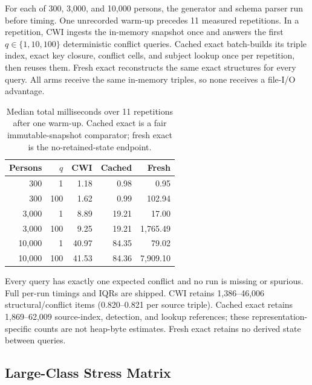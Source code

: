 \documentclass[letterpaper]{article}
\newcommand{\cwi}{\textsc{CWI}}
\begin{document}
For each of 300, 3,000, and 10,000 persons, the generator and schema parser run
before timing.  One unrecorded warm-up precedes 11 measured repetitions.  In a
repetition, \cwi{} ingests the in-memory snapshot once and answers the first
$q\in\{1,10,100\}$ deterministic conflict queries.  Cached exact batch-builds
its triple index, exact key closure, conflict cells, and subject lookup once
per repetition, then reuses them.  Fresh exact reconstructs the same exact
structures for every query.  All arms receive the same in-memory triples, so
none receives a file-I/O advantage.

\begin{table}[t]
\centering
\scriptsize
\setlength{\tabcolsep}{3pt}
\begin{tabular}{rrrrr}
\toprule
Persons & $q$ & \cwi{} & Cached & Fresh \\
\midrule
300    & 1   & 1.18 & 0.98 & 0.95 \\
300    & 100 & 1.62 & 0.99 & 102.94 \\
3,000  & 1   & 8.89 & 19.21 & 17.00 \\
3,000  & 100 & 9.25 & 19.21 & 1,765.49 \\
10,000 & 1   & 40.97 & 84.35 & 79.02 \\
10,000 & 100 & 41.53 & 84.36 & 7,909.10 \\
\bottomrule
\end{tabular}
\caption{Median total milliseconds over 11 repetitions after one warm-up.
Cached exact is a fair immutable-snapshot comparator; fresh exact is the
no-retained-state endpoint.}
\end{table}

Every query has exactly one expected conflict and no run is missing or
spurious.  Full per-run timings and IQRs are shipped.  \cwi{} retains
1,386--46,006 structural/conflict items (0.820--0.821 per source triple).
Cached exact retains 1,869--62,009 source-index, detection, and lookup
references; these representation-specific counts are not heap-byte estimates.
Fresh exact retains no derived state between queries.

\subsection{Large-Class Stress Matrix}
\end{document}
